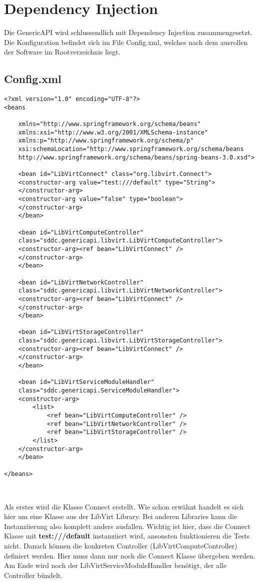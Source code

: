 \section{Dependency Injection}
Die GenericAPI wird schlussendlich mit Dependency Injection zusammengesetzt. 
Die Konfiguration befindet sich im File Config.xml, welches nach dem ausrollen der Software
im Rootverzeichnis liegt.

\subsection{Config.xml}
\begin{lstlisting}[style=XML,frame=single]
<?xml version="1.0" encoding="UTF-8"?>  
<beans  

    xmlns="http://www.springframework.org/schema/beans"  
    xmlns:xsi="http://www.w3.org/2001/XMLSchema-instance"  
    xmlns:p="http://www.springframework.org/schema/p"  
    xsi:schemaLocation="http://www.springframework.org/schema/beans  
    http://www.springframework.org/schema/beans/spring-beans-3.0.xsd">

	<bean id="LibVirtConnect" class="org.libvirt.Connect">
	<constructor-arg value="test:///default" type="String">
	</constructor-arg>
	<constructor-arg value="false" type="boolean">
	</constructor-arg>
	</bean>

	<bean id="LibVirtComputeController" 
	class="sddc.genericapi.libvirt.LibVirtComputeController">
	<constructor-arg><ref bean="LibVirtConnect" />
	</constructor-arg>
	</bean>
	
	<bean id="LibVirtNetworkController" 
	class="sddc.genericapi.libvirt.LibVirtNetworkController">
	<constructor-arg><ref bean="LibVirtConnect" />
	</constructor-arg>
	</bean>
	
	<bean id="LibVirtStorageController" 
	class="sddc.genericapi.libvirt.LibVirtStorageController">
	<constructor-arg><ref bean="LibVirtConnect" />
	</constructor-arg>
	</bean>
	
	<bean id="LibVirtServiceModuleHandler" 
	class="sddc.genericapi.ServiceModuleHandler">
	<constructor-arg>
		<list>
			<ref bean="LibVirtComputeController" />
			<ref bean="LibVirtNetworkController" />
			<ref bean="LibVirtStorageController" />
		</list>
	</constructor-arg>
	</bean>
	             
</beans>



\end{lstlisting}
Als erstes wird die Klasse Connect erstellt. Wie schon erwähnt handelt es sich hier 
um eine Klasse aus der LibVirt Library. Bei anderen Libraries kann die Instanziierung 
also komplett anders ausfallen. Wichtig ist hier, dass die Connect Klasse mit \textbf{test:///default} 
instanziiert wird, ansonsten funktionieren die Tests nicht. Danach können die konkreten 
Controller (LibVirtComputeController) definiert werden. Hier muss dann nur noch die Connect 
Klasse übergeben werden. Am Ende wird noch der LibVirtServiceModuleHandler benötigt, 
der alle Controller bündelt.\\
